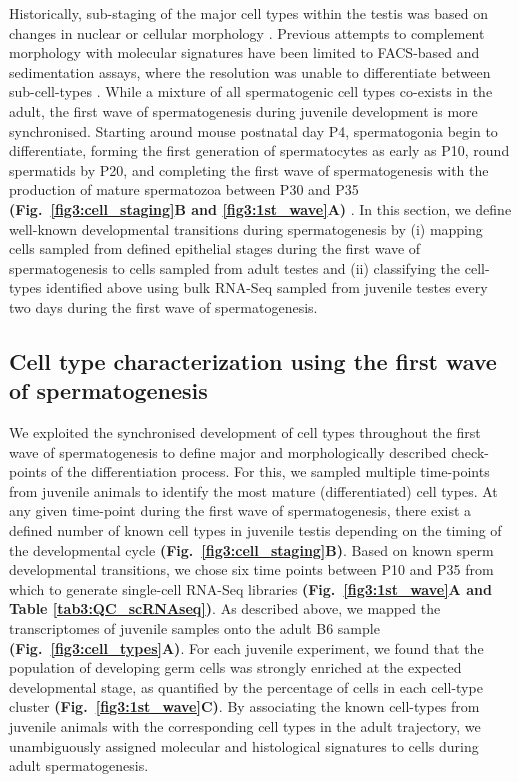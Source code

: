 Historically, sub-staging of the major cell types within the testis was based on changes in nuclear or cellular morphology \citep{Oakberg1956,  Oakberg1956a}. Previous attempts to complement morphology with molecular signatures have been limited to FACS-based and sedimentation assays, where the resolution was unable to differentiate between sub-cell-types \citep{Bastos2005, Gaysinskaya2014, Lam1970, Meistrich1977, Romrell1976, Soumillon2013}. While a mixture of all spermatogenic cell types co-exists in the adult, the first wave of spermatogenesis during juvenile development is more synchronised. Starting around mouse postnatal day P4, spermatogonia begin to differentiate, forming the first generation of spermatocytes as early as P10, round spermatids by P20, and completing the first wave of spermatogenesis with the production of mature spermatozoa between P30 and P35 \textbf{(Fig.~\ref{fig3:cell_staging}B and \ref{fig3:1st_wave}A)} \citep{Bellve1977, Janca1986, Nebel1961}. In this section, we define well-known developmental transitions during spermatogenesis by (i) mapping cells sampled from defined epithelial stages during the first wave of spermatogenesis to cells sampled from adult testes and (ii) classifying the cell-types identified above using bulk RNA-Seq sampled from juvenile testes every two days during the first wave of spermatogenesis. 

\subsection{Cell type characterization using the first wave of spermatogenesis}
 
We exploited the synchronised development of cell types throughout the first wave of spermatogenesis to define major and morphologically described check-points of the differentiation process. For this, we sampled multiple time-points from juvenile animals to identify the most mature (differentiated) cell types. At any given time-point during the first wave of spermatogenesis, there exist a defined number of known cell types in juvenile testis depending on the timing of the developmental cycle \textbf{(Fig.~\ref{fig3:cell_staging}B)}. Based on known sperm developmental transitions, we chose six time points between P10 and P35 from which to generate single-cell RNA-Seq libraries \textbf{(Fig.~\ref{fig3:1st_wave}A and Table \ref{tab3:QC_scRNAseq})}. As described above, we mapped the transcriptomes of juvenile samples onto the adult B6 sample \textbf{(Fig.~\ref{fig3:cell_types}A)}. For each juvenile experiment, we found that the population of developing germ cells was strongly enriched at the expected developmental stage, as quantified by the percentage of cells in each cell-type cluster \textbf{(Fig.~\ref{fig3:1st_wave}C)}. By associating the known cell-types from juvenile animals with the corresponding cell types in the adult trajectory, we unambiguously assigned molecular and histological signatures to cells during adult spermatogenesis.

